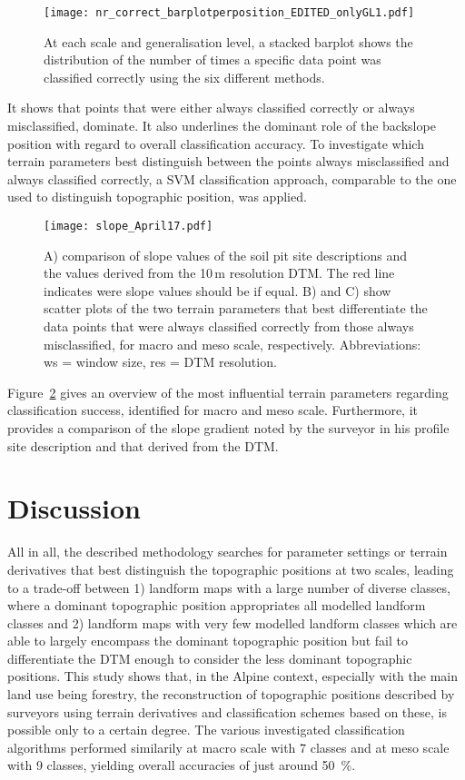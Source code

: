 \documentclass[preprint,12pt,authoryear]{elsarticle}
\begin{document}
\begin{figure}
\texttt{[image: nr\_correct\_barplotperposition\_EDITED\_onlyGL1.pdf]}
\caption{At each scale and generalisation level, a stacked barplot shows the distribution of the number of times a specific data point was classified correctly using the six different methods.}
\label{fig:hist_correct_per_tp}
\end{figure}

It shows that points that were either always classified correctly or always misclassified, dominate. It also underlines the dominant role of the backslope position with regard to overall classification accuracy. To investigate which terrain parameters best distinguish between the points always misclassified and always classified correctly, a SVM classification approach, comparable to the one used to distinguish topographic position, was applied.
\begin{figure}
\texttt{[image: slope\_April17.pdf]}
\caption{A) comparison of slope values of the soil pit site descriptions and the  values derived from the 10\,m resolution DTM. The red line indicates were slope values should be if equal. B) and C) show scatter plots of the two terrain parameters that best differentiate the data points that were always classified correctly from those always misclassified, for macro and meso scale, respectively. Abbreviations: ws = window size, res = DTM resolution.}
\label{fig:slope}
\end{figure}
 Figure~\ref{fig:slope} gives an overview of the most influential terrain parameters regarding classification success, identified for macro and meso scale. Furthermore, it provides a comparison of the slope gradient noted by the surveyor in his profile site description and that derived from the DTM.




\section{Discussion}
All in all, the described methodology searches for parameter settings or terrain derivatives that best distinguish the topographic positions at two scales, leading to a trade-off between 1) landform maps with a large number of diverse classes, where a dominant topographic position appropriates all modelled landform classes and 2) landform maps with very few modelled landform classes which are able to largely encompass the dominant topographic position but fail to differentiate the DTM enough to consider the less dominant topographic positions.
This study shows that, in the Alpine context, especially with the main land use being forestry, the reconstruction of topographic positions described by surveyors using terrain derivatives and classification schemes based on these, is possible only to a certain degree. The various investigated classification algorithms performed similarily at macro scale with 7 classes and at meso scale with 9 classes, yielding overall accuracies of just around 50~\%.
\end{document}
